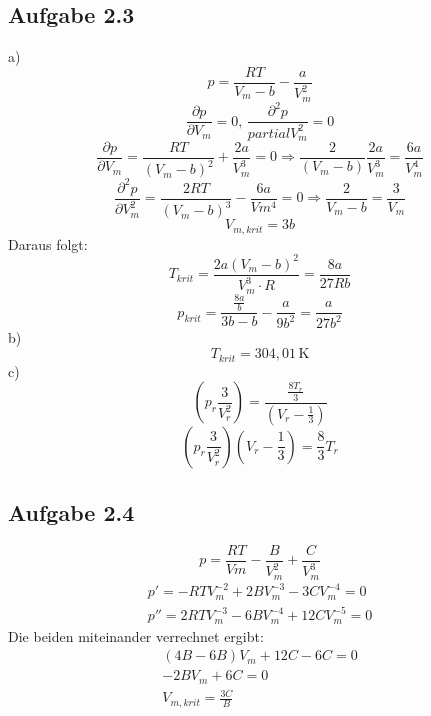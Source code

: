 \documentclass{article}
\begin{document}
\subsection*{Aufgabe 2.3}
a)
\begin{equation*}
    p = \frac{RT}{V_m-b}-\frac{a}{V_m^2}
\end{equation*}
\begin{equation*}
    \frac{\partial p}{\partial V_m} = 0, \, \frac{\partial^2 p}{partial V_m^2}=0
\end{equation*}
\begin{equation*}
    \frac{\partial p}{\partial V_m} = \frac{RT}{(V_m-b)^2}+\frac{2a}{V_m^3}=0 \Rightarrow \frac{2}{(V_m-b)}\frac{2a}{V_m^3} = \frac{6a}{V_m^4}
\end{equation*}
\begin{equation*}
    \frac{\partial^2 p}{\partial V_m^2} = \frac{2RT}{(V_m-b)^3}-\frac{6a}{Vm^4}=0 \Rightarrow \frac{2}{V_m-b}=\frac{3}{V_m}
\end{equation*}
\begin{equation*}
    V_{m,krit} = 3b
\end{equation*}
Daraus folgt:
\begin{equation*}
    T_{krit} = \frac{2a(V_m-b)^2}{V_m^3\cdot R}=\frac{8a}{27Rb}
\end{equation*}
\begin{equation*}
    p_{krit} = \frac{\frac{8a}{b}}{3b-b}-\frac{a}{9b^2} = \frac{a}{27b^2}
\end{equation*}
b)
\begin{equation*}
    T_{krit} = 304,01 \,\mathrm{K}
\end{equation*}
c)
\begin{equation*}
    \left(p_r\frac{3}{V_r^2}\right) = \frac{\frac{8T_r}{3}}{\left(V_r-\frac{1}{3}\right)}
\end{equation*}
\begin{equation*}
    \left(p_r\frac{3}{V_r^2}\right)\left(V_r-\frac{1}{3}\right) = \frac{8}{3}T_r
\end{equation*}

\subsection*{Aufgabe 2.4}
\begin{equation*}
    p = \frac{RT}{Vm}-\frac{B}{V_m^2}+\frac{C}{V_m^3}
\end{equation*}
\begin{eqnarray*}
    p' = -RTV_m^{-2}+2BV_m^{-3}-3CV_m^{-4} = 0\\
    p'' = 2RTV_m^{-3}-6BV_m^{-4}+12CV_m^{-5} = 0
\end{eqnarray*}
Die beiden miteinander verrechnet ergibt:
\begin{eqnarray*}
    (4B-6B)V_m+12C-6C = 0\\
    -2BV_m+6C=0\\
    V_{m,krit} = \frac{3C}{B}
\end{eqnarray*}
\end{document}
